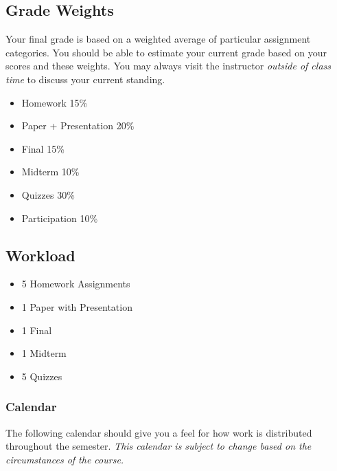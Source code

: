 \documentclass[10pt]{article}
\begin{document}
\subsection{Grade Weights}
Your final grade is based on a weighted average of particular assignment categories.  You should be able to estimate your current grade based on your scores and these weights.  You may always visit the instructor \textit{outside of class time} to discuss your current standing.  
\begin{itemize}
\item Homework 15\%
\item Paper + Presentation 20\%
\item Final 15\%
\item Midterm 10\%
\item Quizzes 30\%
\item Participation 10\%
\end{itemize} 

\subsection{Workload}

\begin{itemize}
\item 5 Homework Assignments
\item 1 Paper with Presentation
\item 1 Final
\item 1 Midterm
\item 5 Quizzes
\end{itemize}

\subsubsection{Calendar}

The following calendar should give you a feel for how work is distributed throughout the semester.  \textit{This calendar is subject to change based on the circumstances of the course.}
\end{document}
